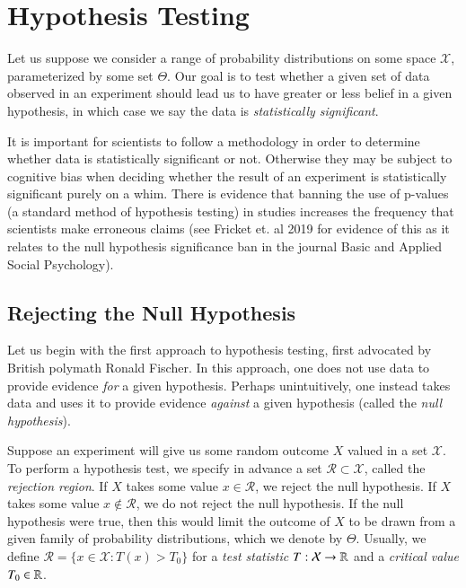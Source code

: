 \chapter{Hypothesis Testing}

Let us suppose we consider a range of probability distributions on some space $\mathcal{X}$, parameterized by some set $\Theta$. Our goal is to test whether a given set of data observed in an experiment should lead us to have greater or less belief in a given hypothesis, in which case we say the data is \emph{statistically significant}.

It is important for scientists to follow a methodology in order to determine whether data is statistically significant or not. Otherwise they may be subject to cognitive bias when deciding whether the result of an experiment is statistically significant purely on a whim. There is evidence that banning the use of p-values (a standard method of hypothesis testing) in studies increases the frequency that scientists make erroneous claims (see Fricket et. al 2019 for evidence of this as it relates to the null hypothesis significance ban in the journal Basic and Applied Social Psychology).

\section{Rejecting the Null Hypothesis}

Let us begin with the first approach to hypothesis testing, first advocated by British polymath Ronald Fischer. In this approach, one does not use data to provide evidence \emph{for} a given hypothesis. Perhaps unintuitively, one instead takes data and uses it to provide evidence \emph{against} a given hypothesis (called the \emph{null hypothesis}).

Suppose an experiment will give us some random outcome $X$ valued in a set $\mathcal{X}$. To perform a hypothesis test, we specify in advance a set $\mathcal{R} \subset \mathcal{X}$, called the \emph{rejection region}. If $X$ takes some value $x \in \mathcal{R}$, we reject the null hypothesis. If $X$ takes some value $x \not \in \mathcal{R}$, we do not reject the null hypothesis. If the null hypothesis were true, then this would limit the outcome of $X$ to be drawn from a given family of probability distributions, which we denote by $\Theta$. Usually, we define $\mathcal{R} = \{ x \in \mathcal{X} : T(x) > T_0 \}$ for a \emph{test statistic} $T: \mathcal{X} \to \operatorname{\mathbb{R}}$ and a \emph{critical value $T_0 \in \operatorname{\mathbb{R}}$}.

